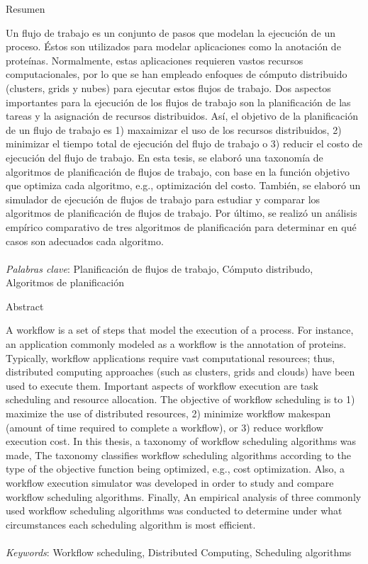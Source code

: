 \begin{center}
Resumen
\end{center}
\noindent Un flujo de trabajo es un conjunto de pasos que modelan la ejecución de un proceso. Éstos son utilizados para modelar aplicaciones como la anotación de proteínas. Normalmente, estas aplicaciones requieren vastos recursos computacionales, por lo que se han empleado enfoques de cómputo distribuido (clusters, grids y nubes) para ejecutar estos flujos de trabajo. Dos aspectos importantes para la ejecución de los flujos de trabajo son la planificación de las tareas y la asignación de recursos distribuidos. Así, el objetivo de la planificación de un flujo de trabajo es 1) maxaimizar el uso de los recursos distribuidos, 2) minimizar el tiempo total de ejecución del flujo de trabajo o 3) reducir el costo de ejecución del flujo de trabajo. En esta tesis, se elaboró una taxonomía de algoritmos de planificación de flujos de trabajo, con base en la función objetivo que optimiza cada algoritmo, e.g., optimización del costo. También, se elaboró un simulador de ejecución de flujos de trabajo para estudiar y comparar los algoritmos de planificación de flujos de trabajo. Por último, se realizó un análisis empírico comparativo de tres algoritmos de planificación para determinar en qué casos son adecuados cada algoritmo.
\\\\
\noindent \emph{Palabras clave}: Planificación de flujos de trabajo, Cómputo distribudo, Algoritmos de planificación

\begin{center}
Abstract
\end{center}
\noindent A workflow is a set of steps that model the execution of a process. For instance, an application commonly modeled as a workflow is the annotation of proteins. Typically, workflow applications require vast computational resources; thus, distributed computing approaches (such as clusters, grids and clouds) have been used to execute them. Important aspects of workflow execution are task scheduling and resource allocation. The objective of workflow scheduling is to 1) maximize the use of distributed resources, 2) minimize workflow makespan (amount of time required to complete a workflow), or 3) reduce workflow execution cost. In this thesis, a taxonomy of workflow scheduling algorithms was made, The taxonomy classifies workflow scheduling algorithms according to the type of the objective function being optimized, e.g., cost optimization. Also, a workflow execution simulator was developed in order to study and compare workflow scheduling algorithms. Finally, An empirical analysis of three commonly used workflow scheduling algorithms was conducted to determine under what circumstances each scheduling algorithm is most efficient.
\\\\
\noindent \emph{Keywords}: Workflow scheduling, Distributed Computing, Scheduling algorithms

\clearpage
